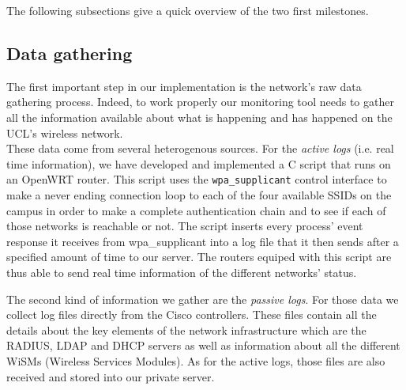 The following subsections give a quick overview of the two first milestones.


\subsection{Data gathering}
The first important step in our implementation is the network's raw data gathering process. Indeed, to work properly our monitoring tool needs to gather all the information available about what is happening and has happened on the UCL's wireless network.\\
These data come from several heterogenous sources. For the \textit{active logs} (i.e. real time information), we have developed and implemented a C script that runs on an OpenWRT router. This script uses the \texttt{wpa\_supplicant} control interface to make a never ending connection loop to each of the four available SSIDs on the campus in order to make a complete authentication chain and to see if each of those networks is reachable or not. The script inserts every process' event response it receives from wpa\_supplicant into a log file that it then sends after a specified amount of time to our server. The routers equiped with this script are thus able to send real time information of the different networks' status.

The second kind of information we gather are the \textit{passive logs}. For those data we collect log files directly from the Cisco controllers. These files contain all the details about the key elements of the network infrastructure which are the RADIUS, LDAP and DHCP servers as well as information about all the different WiSMs (Wireless Services Modules). As for the active logs, those files are also received and stored into our private server.






